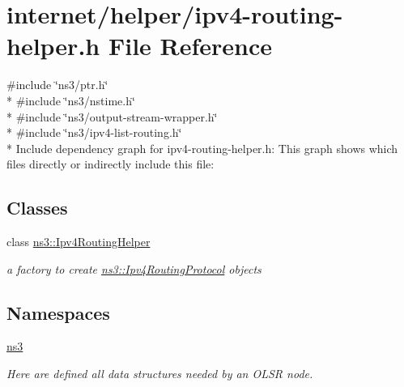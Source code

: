 \hypertarget{ipv4-routing-helper_8h}{}\section{internet/helper/ipv4-\/routing-\/helper.h File Reference}
\label{ipv4-routing-helper_8h}
{\ttfamily \#include \char`\"{}ns3/ptr.\+h\char`\"{}}\\*
{\ttfamily \#include \char`\"{}ns3/nstime.\+h\char`\"{}}\\*
{\ttfamily \#include \char`\"{}ns3/output-\/stream-\/wrapper.\+h\char`\"{}}\\*
{\ttfamily \#include \char`\"{}ns3/ipv4-\/list-\/routing.\+h\char`\"{}}\\*
Include dependency graph for ipv4-\/routing-\/helper.h\+:
This graph shows which files directly or indirectly include this file\+:
\subsection*{Classes}
\begin{DoxyCompactItemize}
\item 
class \hyperlink{classns3_1_1Ipv4RoutingHelper}{ns3\+::\+Ipv4\+Routing\+Helper}
\begin{DoxyCompactList}\small\item\em a factory to create \hyperlink{classns3_1_1Ipv4RoutingProtocol}{ns3\+::\+Ipv4\+Routing\+Protocol} objects \end{DoxyCompactList}\end{DoxyCompactItemize}
\subsection*{Namespaces}
\begin{DoxyCompactItemize}
\item 
 \hyperlink{namespacens3}{ns3}
\begin{DoxyCompactList}\small\item\em Here are defined all data structures needed by an O\+L\+SR node. \end{DoxyCompactList}\end{DoxyCompactItemize}
